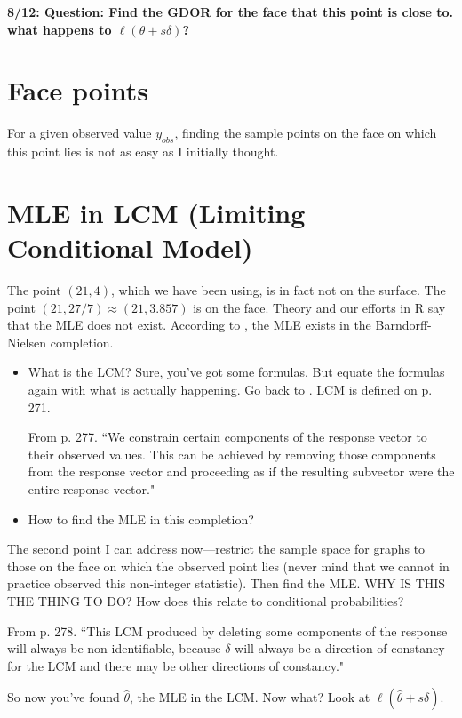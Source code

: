 \documentclass{amsbook}
\theoremstyle{definition}
\theoremstyle{remark}
\begin{document}
\textbf{8/12: Question:  Find the GDOR for the face that this point is close to.  what happens to $\ell(\theta + s \delta)$?}

\section{Face points}
For a given observed value $y_{obs}$, finding the sample points on the face on which this point lies is not as easy as I initially thought.

\section{MLE in LCM (Limiting Conditional Model)}

The point $(21,4)$, which we have been using, is in fact not on the surface.  The point $(21, 27/7) \approx (21, 3.857)$ is on the face.  Theory and our efforts in R say that the MLE does not exist.  According to \citet{Geyer:gdor}, the MLE exists in the Barndorff-Nielsen completion.  
\begin{itemize}
\item What is the LCM?  Sure, you've got some formulas.  But equate the formulas again with what is actually happening.  Go back to \citet[Theorem~6]{Geyer:gdor}.  LCM is defined on p. 271.

From p. 277.  ``We constrain certain components of the response vector to their observed values.  This can be achieved by removing those components from the response vector and proceeding as if the resulting subvector were the entire response vector."
\item How to find the MLE in this completion?
\end{itemize}
The second point I can address now---restrict the sample space for graphs to those on the face on which the observed point lies (never mind that we cannot in practice observed this non-integer statistic).  Then find the MLE.  WHY IS THIS THE THING TO DO?  How does this relate to conditional probabilities?

From p. 278.  ``This LCM produced by deleting some components of the response will always be non-identifiable, because $\delta$ will always be a direction of constancy for the LCM and there may be other directions of constancy."

So now you've found $\hat{\theta}$, the MLE in the LCM.  Now what?  Look at $\ell(\hat{\theta} + s \delta)$.
\end{document}
